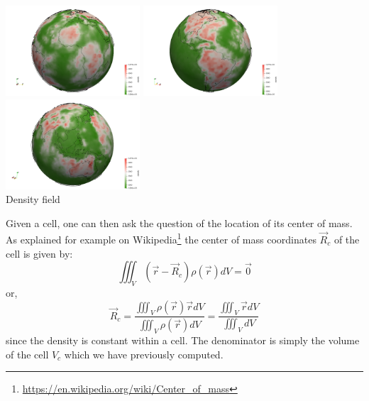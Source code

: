 \begin{center}
\includegraphics[width=5cm]{python_codes/fieldstone_98/images/rho1}
\includegraphics[width=5cm]{python_codes/fieldstone_98/images/rho2}
\includegraphics[width=5cm]{python_codes/fieldstone_98/images/rho3}\\
{\captionfont Density field}
\end{center}

Given a cell, one can then ask the question of the location of its center of mass.
As explained for example on Wikipedia\footnote{\url{https://en.wikipedia.org/wiki/Center_of_mass}}
the center of mass coordinates $\vec{R}_c$ of the cell is given by:
\[
\iiint_V (\vec{r}-\vec{R}_c) \rho(\vec{r}) dV = \vec{0}
\]
or, 
\[
\vec{R}_c = \frac{\iiint_V \rho(\vec{r}) \vec{r} dV}{\iiint_V \rho(\vec{r}) dV}
= \frac{\iiint_V \vec{r} dV}{\iiint_V dV}
\]
since the density is constant within a cell. 
The denominator is simply the volume of the cell $V_c$ which we have previously computed.

